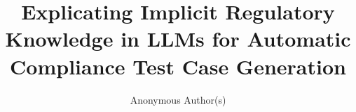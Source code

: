 \documentclass[acmsmall,screen,review,anonymous]{acmart}
\begin{document}


\title{Explicating Implicit Regulatory Knowledge in LLMs for Automatic Compliance Test Case Generation}


\author{Anonymous Author(s)}







\end{document}
